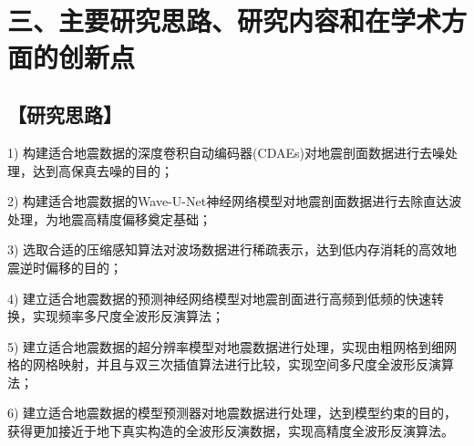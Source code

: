 \documentclass[11pt]{article}
\newcommand{\hei}{\CJKfamily{hei}}
\newcommand{\kai}{\CJKfamily{kai}}
\begin{document}
\section*{\hei\fontsize{11pt}{10pt} \selectfont \\ 三、主要研究思路、研究内容和在学术方面的创新点}
\subsection*{\kai\fontsize{11pt}{10pt} \selectfont【研究思路】}
1) 构建适合地震数据的深度卷积自动编码器(CDAEs)对地震剖面数据进行去噪处理，达到高保真去噪的目的；
\par
2) 构建适合地震数据的Wave-U-Net神经网络模型对地震剖面数据进行去除直达波处理，为地震高精度偏移奠定基础；
\par
3) 选取合适的压缩感知算法对波场数据进行稀疏表示，达到低内存消耗的高效地震逆时偏移的目的；
\par
4) 建立适合地震数据的预测神经网络模型对地震剖面进行高频到低频的快速转换，实现频率多尺度全波形反演算法；
\par
5) 建立适合地震数据的超分辨率模型对地震数据进行处理，实现由粗网格到细网格的网格映射，并且与双三次插值算法进行比较，实现空间多尺度全波形反演算法；
\par
6) 建立适合地震数据的模型预测器对地震数据进行处理，达到模型约束的目的，获得更加接近于地下真实构造的全波形反演数据，实现高精度全波形反演算法。
\end{document}
